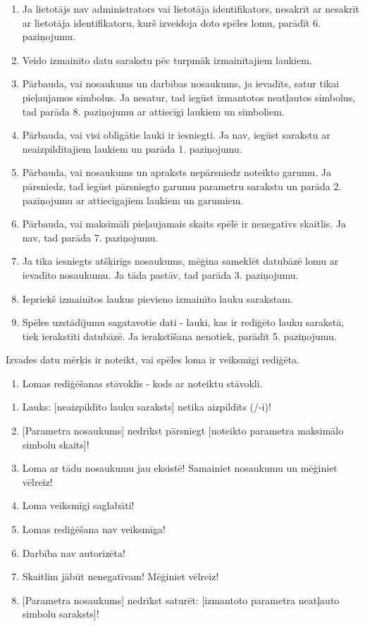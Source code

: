 {
	\begin{enumerate}
		\item Ja lietotājs nav administrators vai lietotāja identifikators, nesakrīt ar nesakrīt ar lietotāja identifikatoru, kurš izveidoja doto spēles lomu, parādīt 6. paziņojumu.
		\item Veido izmainīto datu sarakstu pēc turpmāk izmainītajiem laukiem.
		\item Pārbauda, vai nosaukums un darbības nosaukums, ja ievadīts, satur tikai pieļaujamos simbolus.
		      Ja nesatur, tad iegūst izmantotos neatļautos simbolus, tad parāda 8. paziņojumu ar attiecīgi laukiem un simboliem.
		\item Pārbauda, vai visi obligātie lauki ir iesniegti.
		      Ja nav, iegūst sarakstu ar neaizpildītajiem laukiem un parāda 1. paziņojumu.
		\item Pārbauda, vai nosaukums un apraksts nepārsniedz noteikto garumu.
		      Ja pārsniedz, tad iegūst pārsniegto garumu parametru sarakstu un parāda 2. paziņojumu ar attiecīgajiem laukiem un garumiem.
		\item Pārbauda, vai maksimāli pieļaujamais skaits spēlē ir nenegatīvs skaitlis.
		      Ja nav, tad parāda 7. paziņojumu.
		\item Ja tika iesniegts atšķirīgs nosaukums, mēģina sameklēt datubāzē lomu ar ievadīto nosaukumu.
		      Ja tāda pastāv, tad parāda 3. paziņojumu.
		\item Iepriekš izmainītos laukus pievieno izmainīto lauku sarakstam.
		\item Spēles uzstādījumu sagatavotie dati - lauki, kas ir rediģēto lauku sarakstā, tiek ierakstīti datubāzē.
		      Ja ierakstīšana nenotiek, parādīt 5. paziņojumu.
	\end{enumerate}
}
{
	Izvades datu mērķis ir noteikt, vai spēles loma ir veiksmīgi rediģēta.
	\begin{enumerate}
		\item Lomas rediģēšanas stāvoklis - kods ar noteiktu stāvokli.
	\end{enumerate}
}
{
	\begin{enumerate}
		\item Lauks: [neaizpildīto lauku saraksts] netika aizpildīts (/-i)!
		\item {}[Parametra nosaukums] nedrīkst pārsniegt [noteikto parametra maksimālo simbolu skaits]!
		\item Loma ar tādu nosaukumu jau eksistē! Samainiet nosaukumu un mēģiniet vēlreiz!
		\item Loma veiksmīgi saglabāti!
		\item Lomas rediģēšana nav veiksmīga!
		\item Darbība nav autorizēta!
		\item Skaitlim jābūt nenegatīvam! Mēģiniet vēlreiz!
		\item {}[Parametra nosaukums] nedrīkst saturēt: [izmantoto parametra neatļauto simbolu saraksts]!
	\end{enumerate}
}
